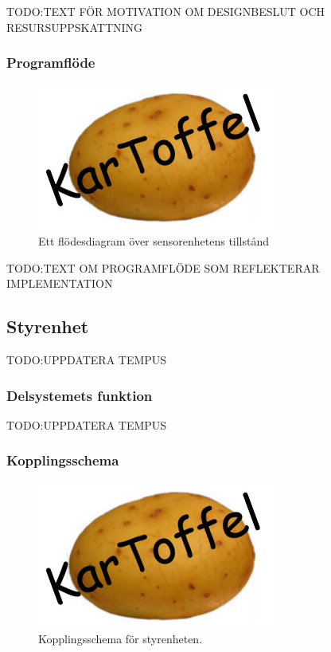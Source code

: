 \documentclass{article}
\begin{document}
TODO:TEXT FÖR MOTIVATION OM DESIGNBESLUT OCH RESURSUPPSKATTNING


\subsubsection{Programflöde}

\begin{figure}[H]
\centering
\includegraphics[scale=0.6]{Logo}
\caption{Ett flödesdiagram över sensorenhetens tillstånd}
\label{fig:sensorenhet_flowchart}
\end{figure}
TODO:TEXT OM PROGRAMFLÖDE SOM REFLEKTERAR IMPLEMENTATION

\subsection{Styrenhet}
TODO:UPPDATERA TEMPUS

\subsubsection{Delsystemets funktion}
TODO:UPPDATERA TEMPUS

\subsubsection{Kopplingsschema}
\begin{figure}[H]
\centering
\includegraphics[scale=0.45]{Logo}
\caption{Kopplingsschema för styrenheten.}
\label{fig:styrenhet_kopplingsschema}
\end{figure}
\end{document}
